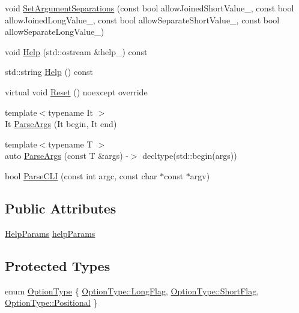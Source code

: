 \begin{DoxyCompactItemize}
void \hyperlink{classargs_1_1_argument_parser_a067fb46018d370df1629bd9a9d7c0bd0}{Set\+Argument\+Separations} (const bool allow\+Joined\+Short\+Value\+\_\+, const bool allow\+Joined\+Long\+Value\+\_\+, const bool allow\+Separate\+Short\+Value\+\_\+, const bool allow\+Separate\+Long\+Value\+\_\+)
\item 
void \hyperlink{classargs_1_1_argument_parser_a783b7d19d1f2687310adb159418ad234}{Help} (std\+::ostream \&help\+\_\+) const
\item 
std\+::string \hyperlink{classargs_1_1_argument_parser_ac7ca97f929a12508187ed28734ae0714}{Help} () const
\item 
virtual void \hyperlink{classargs_1_1_argument_parser_a73b0dc7bc87c3a44345879f34985237f}{Reset} () noexcept override
\item 
{\footnotesize template$<$typename It $>$ }\\It \hyperlink{classargs_1_1_argument_parser_a4bc1f3f3d000f11715fa66ade894bd9b}{Parse\+Args} (It begin, It end)
\item 
{\footnotesize template$<$typename T $>$ }\\auto \hyperlink{classargs_1_1_argument_parser_aa93289021e58e8ad26f06cd671261c36}{Parse\+Args} (const T \&args) -\/$>$ decltype(std\+::begin(args))
\item 
bool \hyperlink{classargs_1_1_argument_parser_a8e79c5bd015bad9648b9c98eecc63fc9}{Parse\+C\+LI} (const int argc, const char $\ast$const $\ast$argv)
\end{DoxyCompactItemize}
\subsection*{Public Attributes}
\begin{DoxyCompactItemize}
\item 
\hyperlink{structargs_1_1_help_params}{Help\+Params} \hyperlink{classargs_1_1_argument_parser_a0b78172b72e892a6776d2d7dec8e8b46}{help\+Params}
\end{DoxyCompactItemize}
\subsection*{Protected Types}
\begin{DoxyCompactItemize}
\item 
enum \hyperlink{classargs_1_1_argument_parser_af01ec624f521beee7a1ac7ff589a3788}{Option\+Type} \{ \hyperlink{classargs_1_1_argument_parser_af01ec624f521beee7a1ac7ff589a3788a8380e6760c5e0d63b4d457e4fae1e4b9}{Option\+Type\+::\+Long\+Flag}, 
\hyperlink{classargs_1_1_argument_parser_af01ec624f521beee7a1ac7ff589a3788a79741ab7ed4b2321708c779a4fa2ad30}{Option\+Type\+::\+Short\+Flag}, 
\hyperlink{classargs_1_1_argument_parser_af01ec624f521beee7a1ac7ff589a3788ac2c87a0ee60e297b8b4eb1fb26b47bea}{Option\+Type\+::\+Positional}
 \}
\end{DoxyCompactItemize}
